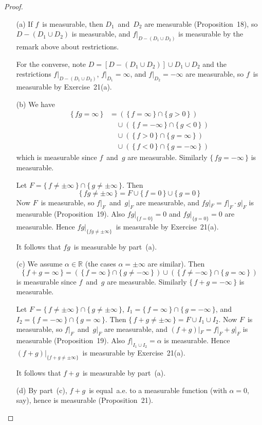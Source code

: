 \documentclass[letterpaper,12pt]{article}
\newcommand{\R}{\mathbb{R}}
\newcommand{\union}{\cup}
\newcommand{\sect}{\cap}
\newcommand{\res}[2]{{#1}|_{#2}}
\theoremstyle{plain}
\theoremstyle{definition}
\theoremstyle{remark}
\begin{document}
\begin{proof}\ 
\begin{enumerate}
\item[(a)] If \(f\)~is measurable, then \(D_1\)~and~\(D_2\) are measurable (Proposition~18), so \(D-(D_1\union D_2)\) is measurable, and \(\res{f}{D-(D_1\union D_2)}\) is measurable by the remark above about restrictions.

For the converse, note \(D=[D-(D_1\union D_2)]\union D_1\union D_2\) and the restrictions \(\res{f}{D-(D_1\union D_2)}\), \(\res{f}{D_1}=\infty\), and \(\res{f}{D_2}=-\infty\) are measurable, so \(f\)~is measurable by Exercise~21(a).

\item[(b)] We have
\begin{align*}
\{\,fg=\infty\,\}&=\left(\,\{\,f=\infty\,\}\sect\{\,g>0\,\}\,\right)\\
	&\quad\union\left(\,\{\,f=-\infty\,\}\sect\{\,g<0\,\}\,\right)\\
	&\quad\union\left(\,\{\,f>0\,\}\sect\{\,g=\infty\,\}\,\right)\\
	&\quad\union\left(\,\{\,f<0\,\}\sect\{\,g=-\infty\,\}\,\right)
\end{align*}
which is measurable since \(f\)~and~\(g\) are measurable. Similarly \(\{\,fg=-\infty\,\}\) is measurable.

Let \(F=\{\,f\ne\pm\infty\,\}\sect\{\,g\ne\pm\infty\,\}\). Then
\[\{\,fg\ne\pm\infty\,\}=F\union\{\,f=0\,\}\union\{\,g=0\,\}\]
Now \(F\)~is measurable, so \(\res{f}{F}\)~and~\(\res{g}{F}\) are measurable, and \(\res{fg}{F}=\res{f}{F}\cdot\res{g}{F}\) is measurable (Proposition~19). Also \(\res{fg}{\{f=0\}}=0\) and \(\res{fg}{\{g=0\}}=0\) are measurable. Hence \(\res{fg}{\{fg\ne\pm\infty\}}\)~is measurable by Exercise~21(a).

It follows that \(fg\)~is measurable by part~(a).

\item[(c)] We assume \(\alpha\in\R\) (the cases \(\alpha=\pm\infty\) are similar). Then
\[\{\,f+g=\infty\,\}=\left(\,\{\,f=\infty\,\}\sect\{\,g\ne-\infty\,\}\,\right)\union\left(\,\{\,f\ne-\infty\,\}\sect\{\,g=\infty\,\}\,\right)\]
is measurable since \(f\)~and~\(g\) are measurable. Similarly \(\{\,f+g=-\infty\,\}\) is measurable.

Let \(F=\{\,f\ne\pm\infty\,\}\sect\{\,g\ne\pm\infty\,\}\), \(I_1=\{\,f=\infty\,\}\sect\{\,g=-\infty\,\}\), and \(I_2=\{\,f=-\infty\,\}\sect\{\,g=\infty\,\}\). Then \(\{\,f+g\ne\pm\infty\,\}=F\union I_1\union I_2\). Now \(F\)~is measurable, so \(\res{f}{F}\)~and~\(\res{g}{F}\) are measurable, and \(\res{(f+g)}{F}=\res{f}{F}+\res{g}{F}\) is measurable (Proposition~19). Also \(\res{f}{I_1\union I_2}=\alpha\) is measurable. Hence \(\res{(f+g)}{\{f+g\ne\pm\infty\}}\)~is measurable by Exercise~21(a).

It follows that \(f+g\)~is measurable by part~(a).

\item[(d)] By part~(c), \(f+g\)~is equal~a.e. to a measurable function (with \(\alpha=0\), say), hence is measurable (Proposition~21).\qedhere
\end{enumerate}
\end{proof}
\end{document}
